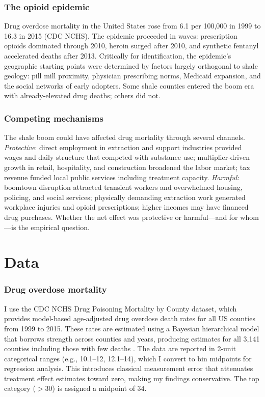 \documentclass[12pt]{article}
\begin{document}
\subsubsection*{The opioid epidemic} Drug overdose mortality in the United States rose from 6.1 per 100,000 in 1999 to 16.3 in 2015 (CDC NCHS). The epidemic proceeded in waves: prescription opioids dominated through 2010, heroin surged after 2010, and synthetic fentanyl accelerated deaths after 2013. Critically for identification, the epidemic's geographic starting points were determined by factors largely orthogonal to shale geology: pill mill proximity, physician prescribing norms, Medicaid expansion, and the social networks of early adopters. Some shale counties entered the boom era with already-elevated drug deaths; others did not.

\subsubsection*{Competing mechanisms} The shale boom could have affected drug mortality through several channels. \textit{Protective}: direct employment in extraction and support industries provided wages and daily structure that competed with substance use; multiplier-driven growth in retail, hospitality, and construction broadened the labor market; tax revenue funded local public services including treatment capacity. \textit{Harmful}: boomtown disruption attracted transient workers and overwhelmed housing, policing, and social services; physically demanding extraction work generated workplace injuries and opioid prescriptions; higher incomes may have financed drug purchases. Whether the net effect was protective or harmful---and for whom---is the empirical question.


\section{Data}

\subsubsection*{Drug overdose mortality} I use the CDC NCHS Drug Poisoning Mortality by County dataset, which provides model-based age-adjusted drug overdose death rates for all US counties from 1999 to 2015. These rates are estimated using a Bayesian hierarchical model that borrows strength across counties and years, producing estimates for all 3,141 counties including those with few deaths \citep{rossen2013}. The data are reported in 2-unit categorical ranges (e.g., 10.1--12, 12.1--14), which I convert to bin midpoints for regression analysis. This introduces classical measurement error that attenuates treatment effect estimates toward zero, making my findings conservative. The top category ($>$30) is assigned a midpoint of 34.
\end{document}
